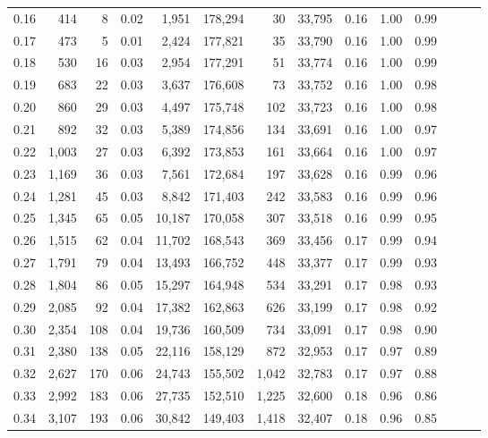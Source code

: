 \begin{tabular}{rrrrrrrrrrrrrr}
0.16 &    414 &    8 &  0.02 &    1,951 &  178,294 &      30 &  33,795 &  0.16 &  1.00 &      0.99 \\
0.17 &    473 &    5 &  0.01 &    2,424 &  177,821 &      35 &  33,790 &  0.16 &  1.00 &      0.99 \\
0.18 &    530 &   16 &  0.03 &    2,954 &  177,291 &      51 &  33,774 &  0.16 &  1.00 &      0.99 \\
0.19 &    683 &   22 &  0.03 &    3,637 &  176,608 &      73 &  33,752 &  0.16 &  1.00 &      0.98 \\
0.20 &    860 &   29 &  0.03 &    4,497 &  175,748 &     102 &  33,723 &  0.16 &  1.00 &      0.98 \\
0.21 &    892 &   32 &  0.03 &    5,389 &  174,856 &     134 &  33,691 &  0.16 &  1.00 &      0.97 \\
0.22 &  1,003 &   27 &  0.03 &    6,392 &  173,853 &     161 &  33,664 &  0.16 &  1.00 &      0.97 \\
0.23 &  1,169 &   36 &  0.03 &    7,561 &  172,684 &     197 &  33,628 &  0.16 &  0.99 &      0.96 \\
0.24 &  1,281 &   45 &  0.03 &    8,842 &  171,403 &     242 &  33,583 &  0.16 &  0.99 &      0.96 \\
0.25 &  1,345 &   65 &  0.05 &   10,187 &  170,058 &     307 &  33,518 &  0.16 &  0.99 &      0.95 \\
0.26 &  1,515 &   62 &  0.04 &   11,702 &  168,543 &     369 &  33,456 &  0.17 &  0.99 &      0.94 \\
0.27 &  1,791 &   79 &  0.04 &   13,493 &  166,752 &     448 &  33,377 &  0.17 &  0.99 &      0.93 \\
0.28 &  1,804 &   86 &  0.05 &   15,297 &  164,948 &     534 &  33,291 &  0.17 &  0.98 &      0.93 \\
0.29 &  2,085 &   92 &  0.04 &   17,382 &  162,863 &     626 &  33,199 &  0.17 &  0.98 &      0.92 \\
0.30 &  2,354 &  108 &  0.04 &   19,736 &  160,509 &     734 &  33,091 &  0.17 &  0.98 &      0.90 \\
0.31 &  2,380 &  138 &  0.05 &   22,116 &  158,129 &     872 &  32,953 &  0.17 &  0.97 &      0.89 \\
0.32 &  2,627 &  170 &  0.06 &   24,743 &  155,502 &   1,042 &  32,783 &  0.17 &  0.97 &      0.88 \\
0.33 &  2,992 &  183 &  0.06 &   27,735 &  152,510 &   1,225 &  32,600 &  0.18 &  0.96 &      0.86 \\
0.34 &  3,107 &  193 &  0.06 &   30,842 &  149,403 &   1,418 &  32,407 &  0.18 &  0.96 &      0.85 \\

\end{tabular}
